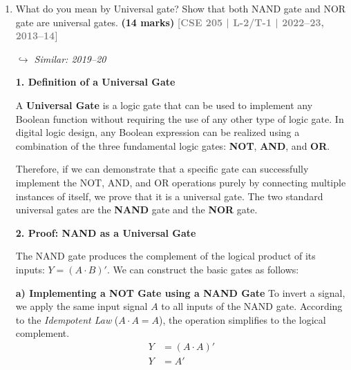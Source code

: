 \documentclass[12pt,a3paper]{article}
\newcommand{\yr}[1]{\hfill\textcolor{gray}{\small\textbf{[#1]}}}
\newcommand{\mk}[1]{\textcolor{orange!70!black}{\small\textbf{(#1 marks)}}}
\newcommand{\variant}[1]{\par\vspace{1pt}\textcolor{blue!50!black}%
  {\footnotesize\textit{$\hookrightarrow$ Similar: #1}}}
\begin{document}
\begin{enumerate}
\begin{tcolorbox}[enhanced,breakable,ansbox,colback=cA!4,colframe=cA,boxrule=0.8pt,arc=5pt,title={\textbf{Answer}},fonttitle=\bfseries\color{white},colbacktitle=cA]
\begin{center}
\end{center}

\end{tcolorbox}

\item What do you mean by Universal gate? Show that both NAND gate and NOR gate are universal gates.
\mk{14} \yr{CSE 205 | L-2/T-1 | 2022--23, 2013--14} \variant{2019--20}

\begin{tcolorbox}[enhanced,breakable,ansbox,colback=cA!4,colframe=cA,boxrule=0.8pt,arc=5pt,title={\textbf{Answer}},fonttitle=\bfseries\color{white},colbacktitle=cA]

\textbf{1. Definition of a Universal Gate}

A \textbf{Universal Gate} is a logic gate that can be used to implement any Boolean function without requiring the use of any other type of logic gate. In digital logic design, any Boolean expression can be realized using a combination of the three fundamental logic gates: \textbf{NOT}, \textbf{AND}, and \textbf{OR}. 

Therefore, if we can demonstrate that a specific gate can successfully implement the NOT, AND, and OR operations purely by connecting multiple instances of itself, we prove that it is a universal gate. The two standard universal gates are the \textbf{NAND} gate and the \textbf{NOR} gate.

\vspace{0.5cm}
\textbf{2. Proof: NAND as a Universal Gate}

The NAND gate produces the complement of the logical product of its inputs: $Y = (A \cdot B)'$. We can construct the basic gates as follows:

\textbf{a) Implementing a NOT Gate using a NAND Gate}
To invert a signal, we apply the same input signal $A$ to all inputs of the NAND gate. According to the \textit{Idempotent Law} ($A \cdot A = A$), the operation simplifies to the logical complement.
\begin{align*}
    Y &= (A \cdot A)' \\
    Y &= A'
\end{align*}


\end{tcolorbox}
\end{enumerate}
\end{document}
